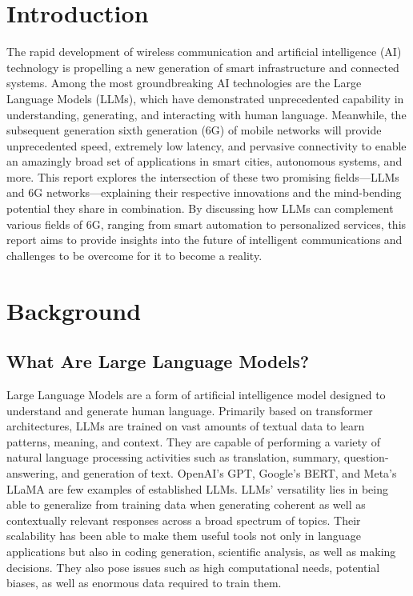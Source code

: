 \documentclass[12pt]{article}
\begin{document}
\section{Introduction}
The rapid development of wireless communication and artificial intelligence (AI) technology is propelling a new generation of smart infrastructure and connected systems. Among the most groundbreaking AI technologies are the Large Language Models (LLMs), which have demonstrated unprecedented capability in understanding, generating, and interacting with human language. Meanwhile, the subsequent generation sixth generation (6G) of mobile networks will provide unprecedented speed, extremely low latency, and pervasive connectivity to enable an amazingly broad set of applications in smart cities, autonomous systems, and more. This report explores the intersection of these two promising fields—LLMs and 6G networks—explaining their respective innovations and the mind-bending potential they share in combination. By discussing how LLMs can complement various fields of 6G, ranging from smart automation to personalized services, this report aims to provide insights into the future of intelligent communications and challenges to be overcome for it to become a reality.
\newpage
\section{Background}
	\subsection{What Are Large Language Models?}
	Large Language Models are a form of artificial intelligence model designed to understand and generate human language. Primarily based on transformer architectures, LLMs are trained on vast amounts of textual data to learn patterns, meaning, and context. They are capable of performing a variety of natural language processing activities such as translation, summary, question-answering, and generation of text. OpenAI’s GPT, Google’s BERT, and Meta’s LLaMA are few examples of established LLMs. LLMs' versatility lies in being able to generalize from training data when generating coherent as well as contextually relevant responses across a broad spectrum of topics. Their scalability has been able to make them useful tools not only in language applications but also in coding generation, scientific analysis, as well as making decisions. They also pose issues such as high computational needs, potential biases, as well as enormous data required to train them.
\end{document}
